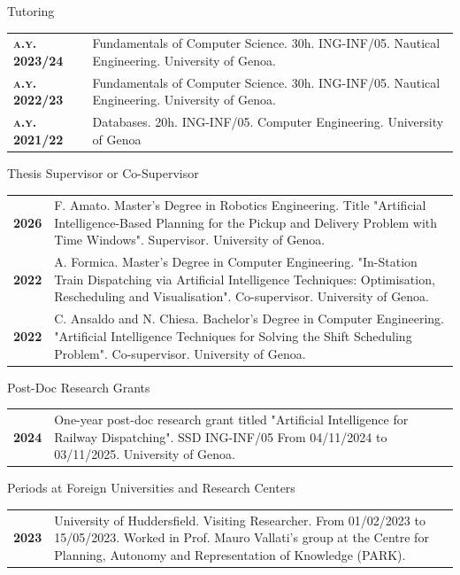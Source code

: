 \documentclass{resume} %
\begin{document}
\pagebreak
\begin{rSection}{Tutoring}
	\begin{tabularx}{0.95\textwidth} {lp{14cm}}
\textbf{\textsc{a.y. 2023/24}} & Fundamentals of Computer Science. 30h. ING-INF/05. Nautical Engineering. University of Genoa.  \\
\textbf{\textsc{a.y. 2022/23}} & Fundamentals of Computer Science. 30h. ING-INF/05. Nautical Engineering. University of Genoa.  \\
\textbf{\textsc{a.y. 2021/22}} & Databases. 20h. ING-INF/05. Computer Engineering. University of Genoa \end{tabularx}
\end{rSection}
\begin{rSection}{Thesis Supervisor or Co-Supervisor}
	\begin{tabularx}{0.95\textwidth} {lp{14cm}}
 \textbf{2026} & F. Amato. Master's Degree in Robotics Engineering. Title "Artificial Intelligence-Based Planning for the Pickup and Delivery Problem with Time Windows". Supervisor. University of Genoa.  \\
 \textbf{2022} & A. Formica. Master’s Degree in Computer Engineering. "In-Station Train Dispatching via Artificial Intelligence Techniques: Optimisation, Rescheduling and Visualisation". Co-supervisor. University of Genoa.  \\
 \textbf{2022} & C. Ansaldo and N. Chiesa. Bachelor’s Degree in Computer Engineering. "Artificial Intelligence Techniques for Solving the Shift Scheduling Problem". Co-supervisor. University of Genoa.
 \end{tabularx}
\end{rSection}

\begin{rSection}{Post-Doc Research Grants}
	\begin{tabularx}{0.95\textwidth} {lp{14cm}}
 \textbf{2024} & One-year post-doc research grant titled "Artificial Intelligence for Railway Dispatching". SSD ING-INF/05 From 04/11/2024 to 03/11/2025. University of Genoa.
 \end{tabularx}
\end{rSection}

\begin{rSection}{Periods at Foreign Universities and Research Centers}
	\begin{tabularx}{0.95\textwidth} {lp{14cm}}
 \textbf{2023} & University of Huddersfield. Visiting Researcher. From 01/02/2023 to 15/05/2023. Worked in Prof. Mauro Vallati’s group at the Centre for Planning, Autonomy and Representation of Knowledge (PARK).
 \end{tabularx}
\end{rSection}
\end{document}
